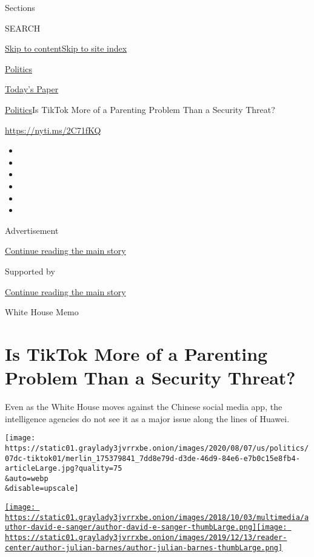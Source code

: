 Sections

SEARCH

\protect\hyperlink{site-content}{Skip to
content}\protect\hyperlink{site-index}{Skip to site index}

\href{https://www.nytimes3xbfgragh.onion/section/politics}{Politics}

\href{https://myaccount.nytimes3xbfgragh.onion/auth/login?response_type=cookie\&client_id=vi}{}

\href{https://www.nytimes3xbfgragh.onion/section/todayspaper}{Today's
Paper}

\href{/section/politics}{Politics}\textbar{}Is TikTok More of a
Parenting Problem Than a Security Threat?

\url{https://nyti.ms/2C71fKQ}

\begin{itemize}
\item
\item
\item
\item
\item
\item
\end{itemize}

Advertisement

\protect\hyperlink{after-top}{Continue reading the main story}

Supported by

\protect\hyperlink{after-sponsor}{Continue reading the main story}

White House Memo

\hypertarget{is-tiktok-more-of-a-parenting-problem-than-a-security-threat}{%
\section{Is TikTok More of a Parenting Problem Than a Security
Threat?}\label{is-tiktok-more-of-a-parenting-problem-than-a-security-threat}}

Even as the White House moves against the Chinese social media app, the
intelligence agencies do not see it as a major issue along the lines of
Huawei.

\texttt{[image: https://static01.graylady3jvrrxbe.onion/images/2020/08/07/us/politics/07dc-tiktok01/merlin\_175379841\_7dd8e79d-d3de-46d9-84e6-e7b0c15e8fb4-articleLarge.jpg?quality=75\\\&auto=webp\\\&disable=upscale]}

\href{https://www.nytimes3xbfgragh.onion/by/david-e-sanger}{\texttt{[image: https://static01.graylady3jvrrxbe.onion/images/2018/10/03/multimedia/author-david-e-sanger/author-david-e-sanger-thumbLarge.png]}}\href{https://www.nytimes3xbfgragh.onion/by/julian-e-barnes}{\texttt{[image: https://static01.graylady3jvrrxbe.onion/images/2019/12/13/reader-center/author-julian-barnes/author-julian-barnes-thumbLarge.png]}}

